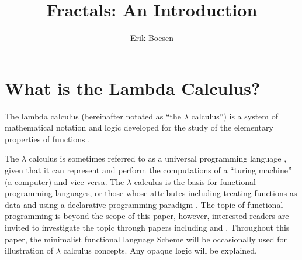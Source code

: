 \documentclass{article}
\begin{document}
\title{Fractals: An Introduction}
\author{Erik Boesen}
\maketitle

\begin{abstract}
\end{abstract}

\section{What is the Lambda Calculus?}
The lambda calculus (hereinafter notated as ``the $\lambda$ calculus'') is a system of mathematical notation and logic developed for the study of the elementary properties of functions \cite{rojastutorial}.

The $\lambda$ calculus is sometimes referred to as a universal programming language \cite{rojastutorial}, given that it can represent and perform the computations of a ``turing machine'' (a computer) and vice versa. The $\lambda$ calculus is the basis for functional programming languages, or those whose attributes including treating functions as data and using a declarative programming paradigm \cite{hudakevolution}. The topic of functional programming is beyond the scope of this paper, however, interested readers are invited to investigate the topic through papers including \cite{totalfp} and \cite{hudakevolution}. Throughout this paper, the minimalist functional language Scheme will be occasionally used for illustration of $\lambda$ calculus concepts. Any opaque logic will be explained.


\end{document}
